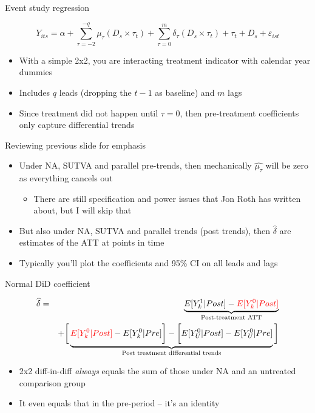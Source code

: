 \documentclass{beamer}
\begin{document}
\begin{frame}{Event study regression}

 $$Y_{its} = \alpha + \sum_{\tau=-2}^{-q}\mu_{\tau} (D_s \times \tau_t) + \sum_{\tau=0}^m\delta_{\tau} (D_s \times \tau_t) + \tau_t + D_s + \varepsilon_{ist}$$
		\begin{itemize}
		\item With a simple 2x2, you are interacting treatment indicator with calendar year dummies
		\item Includes $q$ leads (dropping the $t-1$ as baseline) and $m$ lags
		\item Since treatment did not happen until $\tau=0$, then pre-treatment coefficients only capture differential trends
		\end{itemize}
\end{frame}

\begin{frame}{Reviewing previous slide for emphasis}


\begin{itemize}
\item Under NA, SUTVA and parallel pre-trends, then mechanically $\widehat{\mu_{\tau}}$ will be zero as everything cancels out
	\begin{itemize}
\item There are still specification and power issues that Jon Roth has written about, but I will skip that
	\end{itemize}
\item But also under NA, SUTVA and parallel trends (post trends), then $\widehat{\delta}$ are estimates of the ATT at points in time
\item  Typically you'll plot the coefficients and 95\% CI on all leads and lags
\end{itemize}

\end{frame}

\begin{frame}{Normal DiD coefficient}

\begin{eqnarray*}
\widehat{\delta} &=& \underbrace{E[Y^1_k | Post] - \textcolor{red}{E[Y^0_k | Post]}}_{\mathclap{\text{Post-treatment ATT}}} \\
&& + \bigg [  \underbrace{\textcolor{red}{E[Y^0_k | Post]} - E[Y^0_k | Pre] \bigg ] - \bigg [ E[Y^0_U | Post] - E[Y_U^0 | Pre] }_{\mathclap{\text{Post treatment differential trends}}} \bigg ]
\end{eqnarray*}


\begin{itemize}
\item 2x2 diff-in-diff \emph{always} equals the sum of those under NA and an untreated comparison group
\item It even equals that in the pre-period -- it's an identity
\end{itemize}



\end{frame}
\end{document}
